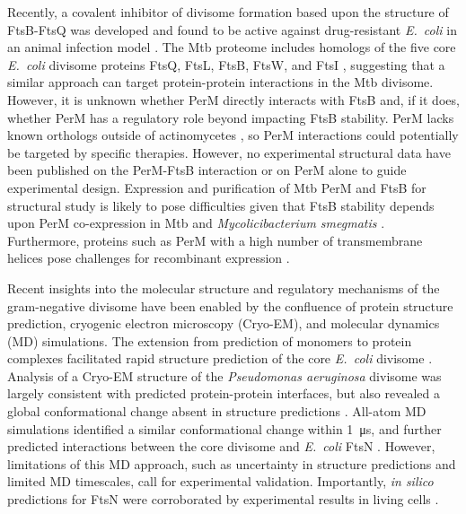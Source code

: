 \documentclass[twocolumn,pdflatex,sn-nature]{sn-jnl}%
\newcommand\ec{\textit{E.~coli}}
\newcommand\mtb{Mtb}
\newcommand\msmegfull{\textit{Mycolicibacterium smegmatis}}
\newcommand\pafull{\textit{Pseudomonas aeruginosa}}
\begin{document}
Recently, a covalent inhibitor of divisome formation based upon the structure of FtsB-FtsQ was developed and found to be active against drug-resistant \ec{} in an animal infection model \citep{paulussenCovalentProteomimeticInhibitor2022}.
The \mtb{} proteome includes homologs of the five core \ec{} divisome proteins FtsQ, FtsL, FtsB, FtsW, and FtsI \citep{wuCharacterizationConservedNovel2018}, suggesting that a similar approach can target protein-protein interactions in the \mtb{} divisome.
However, it is unknown whether PerM directly interacts with FtsB  \citep{wangPersistentMycobacteriumTuberculosis2019} and, if it does, whether PerM has a regulatory role beyond impacting FtsB stability.
PerM lacks known orthologs outside of actinomycetes \citep{goodsmithDisruptionTuberculosisMembrane2015}, so PerM interactions could potentially be targeted by specific therapies. However, no experimental structural data have been published on the PerM-FtsB interaction or on PerM alone to guide experimental design.
Expression and purification of \mtb{} PerM and FtsB for structural study is likely to pose difficulties given that FtsB stability depends upon PerM co-expression in \mtb{} and \msmegfull{} \citep{wangPersistentMycobacteriumTuberculosis2019}.
Furthermore, proteins such as PerM with a high number of transmembrane helices pose challenges for recombinant expression \citep{graveHighthroughputStrategyIdentification2022, korepanovaCloningExpressionMultiple2005}.

Recent insights into the molecular structure and regulatory mechanisms of the gram-negative divisome have been enabled by the confluence of protein structure prediction, cryogenic electron microscopy (Cryo-EM), and molecular dynamics (MD) simulations.
The extension from prediction of monomers to protein complexes \citep{baekAccuratePredictionProtein2021, evansProteinComplexPrediction2022} facilitated rapid structure prediction of the core \ec{} divisome \citep{attaibiUpdatedModelDivisome2022, cravenModelInteractionsFtsQLB2022}.
Analysis of a Cryo-EM structure of the \pafull{} divisome was largely consistent with predicted protein-protein interfaces, but also revealed a global conformational change absent in structure predictions \citep{kashammerCryoEMStructureBacterial2023}.
All-atom MD simulations identified a similar conformational change within \qty{1}{\us}, and further predicted interactions between the core divisome and \ec{} FtsN \citep{brittonConformationalChangesEssential2023}.
However, limitations of this MD approach, such as uncertainty in structure predictions and limited MD timescales, call for experimental validation. Importantly, \textit{in silico} predictions for FtsN were corroborated by experimental results in living cells \citep{parkEssentialDomainFtsN2023}.
\end{document}
